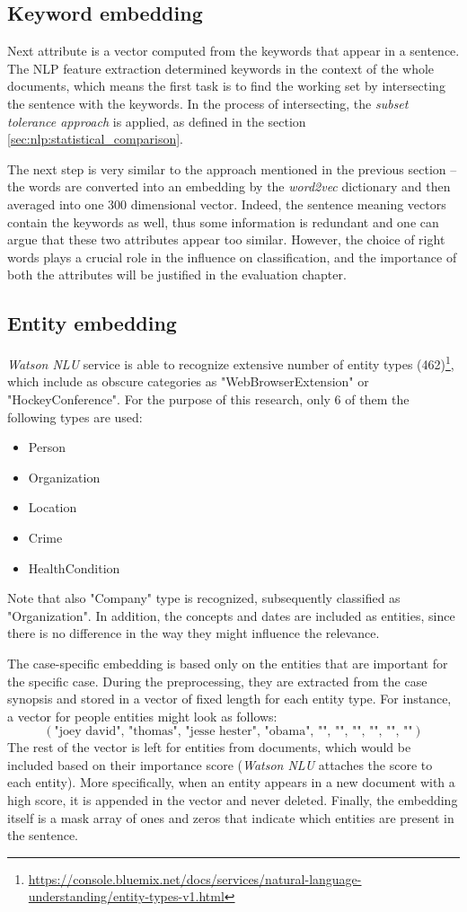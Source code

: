 \documentclass[
  digital, %
  notable,   %
  nolof,     %
  nolot,     %
]{fithesis3}
\begin{document}
\subsection{Keyword embedding}
Next attribute is a vector computed from the keywords that appear in a sentence.
The NLP feature extraction determined keywords in the context of the whole documents, which means the first task is to find the working set by intersecting the sentence with the keywords.
In the process of intersecting, the \textit{subset tolerance approach} is applied, as defined in the section \ref{sec:nlp:statistical_comparison}.

The next step is very similar to the approach mentioned in the previous section -- the words are converted into an embedding by the \textit{word2vec} dictionary and then averaged into one 300 dimensional vector.
Indeed, the sentence meaning vectors contain the keywords as well, thus some information is redundant and one can argue that these two attributes appear too similar.
However, the choice of right words plays a crucial role in the influence on classification, and the importance of both the attributes will be justified in the evaluation chapter.

\subsection{Entity embedding}
\label{sec:entity_embedding}
\textit{Watson NLU} service is able to recognize extensive number of entity types (462)\footnote{\url{https://console.bluemix.net/docs/services/natural-language-understanding/entity-types-v1.html}}, 
which include as obscure categories as "WebBrowserExtension" or "HockeyConference".
For the purpose of this research, only 6 of them the following types are used:
\begin{itemize}
\item Person
\item Organization
\item Location
\item Crime
\item HealthCondition
\end{itemize}
Note that also "Company" type is recognized, subsequently classified as "Organization".
In addition, the concepts and dates are included as entities, since there is no difference in the way they might influence the relevance.

The case-specific embedding is based only on the entities that are important for the specific case.
During the preprocessing, they are extracted from the case synopsis and stored in a vector of fixed length for each entity type. For instance, a vector for people entities might look as follows:
$$
(\text{"joey david", "thomas", "jesse hester", "obama", "", "", "", "", "", ""})
$$
The rest of the vector is left for entities from documents, which would be included based on their importance score (\textit{Watson NLU} attaches the score to each entity).
More specifically, when an entity appears in a new document with a high score, it is appended in the vector and never deleted.
Finally, the embedding itself is a mask array of ones and zeros that indicate which entities are present in the sentence.
\end{document}
